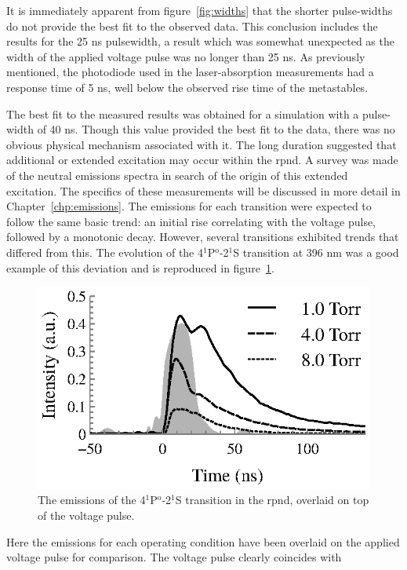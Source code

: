 It is immediately apparent from figure~\ref{fig:widths} that the shorter
pulse-widths do not provide the best fit to the observed data. This conclusion
includes the results for the 25 ns pulsewidth, a result which was somewhat
unexpected as the width of the applied voltage pulse was no longer than 25 ns.
As previously mentioned, the photodiode used in the laser-absorption
measurements had a response time of 5 ns, well below the observed rise time of
the metastables.

The best fit to the measured results was obtained for a simulation with a
pulse-width of 40 ns. Though this value provided the best fit to the data, there
was no obvious physical mechanism associated with it. The long duration
suggested that additional or extended excitation may occur within the
\acs{rpnd}. A survey was made of the neutral emissions spectra in search of the
origin of this extended excitation. The specifics of these measurements will be
discussed in more detail in Chapter~\ref{chp:emissions}. The emissions for each
transition were expected to follow the same basic trend: an initial rise
correlating with the voltage pulse, followed by a monotonic decay. However,
several transitions exhibited trends that differed from this. The evolution of
the 4$^1$P$^\mathrm{o}$-2$^1$S transition at 396 nm was a good example of this
deviation and is reproduced in figure~\ref{fig:double}.
\begin{figure}
  \centering
  \includegraphics{./chapters/modeling/figures/double.eps}
  \caption{The emissions of the 4$^1$P$^\mathrm{o}$-2$^1$S transition in the
  \acs{rpnd}, overlaid on top of the voltage pulse.}
  \label{fig:double}
\end{figure}
Here the emissions for each operating condition have been overlaid on the
applied voltage pulse for comparison. The voltage pulse clearly coincides with
